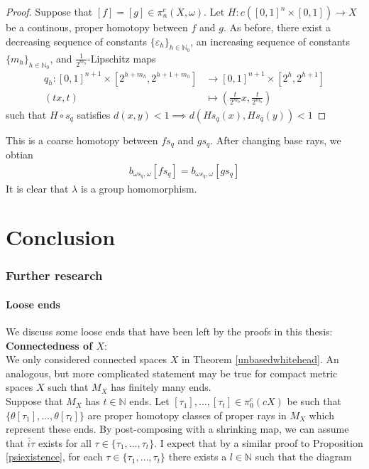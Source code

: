 \documentclass[a4paper,11pt]{article}
\theoremstyle{definition}
\theoremstyle{plain}
\theoremstyle{remark}
\begin{document}
{\begin{proof}
Suppose that $[f] = [g] \in \pi_{n}^{e}(X,\omega)$. Let $H:c ([0,1]^n \times [0,1]) \rightarrow X$ be a continous, proper homotopy between $f$ and $g$. As before, there exist a decreasing sequence of constants $\{\varepsilon_{h}\}_{h\in \mathbb{N}_{0}}$, an increasing sequence of constants $\{m_{h}\}_{h\in \mathbb{N}_{0}}$, and $\frac{1}{2^{m_{h}}}$-Lipschitz maps
\begin{align*}
q_{h}: [0,1]^{n+1} \times [2^{h+m_{h}}, 2^{h+1+m_{h}}] &\rightarrow [0,1]^{n+1} \times [2^{h}, 2^{h+1}]\\
 (tx,t)&\mapsto (\frac{t}{2^{m_{h}}}x, \frac{t}{2^{m_{h}}})
\end{align*} 
such that $H\circ s_{q}$ satisfies $d(x,y)< 1 \implies d(H s_{q}(x),H s_{q}(y))<1$
\end{proof}
This is a coarse homotopy between $fs_{q}$ and $gs_{q}$. After changing base rays, we obtian 
\begin{align*}
b_{\omega s_{q},\omega}[fs_{q}] = b_{\omega s_{q},\omega}[g s_{q}]
\end{align*}
It is clear that $\lambda$ is a group homomorphism. 
\newpage
\part{Conclusion}


\section{Further research}
\subsection{Loose ends}

We discuss some loose ends that have been left by the proofs in this thesis: \\

\textbf{Connectedness of $X$}: \\

We only considered connected spaces $X$ in Theorem \ref{unbasedwhitehead}. An analogous, but more complicated statement may be true for compact metric spaces $X$ such that $M_{X}$ has finitely many ends. \\

Suppose that $M_{X}$ has $t\in \mathbb{N}$ ends. Let $[\tau_{1}],\dots,[\tau_{t}]\in \pi_{0}^{c}(cX)$ be such that $\{\theta[\tau_{1}],\dots, \theta[\tau_{t}]\}$ are proper homotopy classes of proper rays in $M_{X}$ which represent these ends. By post-composing with a shrinking map, we can assume that $\widetilde{i\tau}$ exists for all $\tau\in \{\tau_{1},\dots, \tau_{t}\}$. I expect that by a similar proof to Proposition \ref{psiexistence}, for each $\tau\in \{\tau_{1},\dots, \tau_{t}\}$ there exists a $l \in \mathbb{N}$ such that the diagram


}
\end{document}
